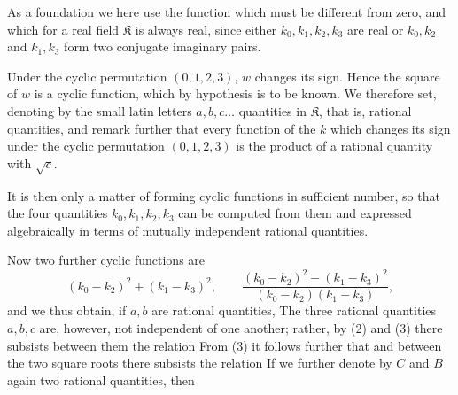 As a foundation we here use the function
which must be different from zero, and which for a real field $\mathfrak{K}$
is always real, since either $k_0, k_1, k_2, k_3$ are real or $k_0, k_2$ and
$k_1, k_3$ form two conjugate imaginary pairs.

Under the cyclic permutation $(0, 1, 2, 3)$, $w$ changes its sign. Hence the
square of $w$ is a cyclic function, which by hypothesis is to be known. We
therefore set, denoting by the small latin letters $a, b, c \ldots$
quantities in $\mathfrak{K}$, that is, rational quantities,
and remark further that every function of the $k$ which changes its sign
under the cyclic permutation $(0, 1, 2, 3)$ is the product of a rational
quantity with $\sqrt{c}$.

It is then only a matter of forming cyclic functions in sufficient number, so
that the four quantities $k_0, k_1, k_2, k_3$ can be computed from them and
expressed algebraically in terms of mutually independent rational quantities.

Now two further cyclic functions are
\[
(k_0 - k_2)^2 + (k_1 - k_3)^2, \qquad \frac{(k_0 - k_2)^2 - (k_1 - k_3)^2}{(k_0 - k_2)(k_1 - k_3)},
\]
and we thus obtain, if $a, b$ are rational quantities,
The three rational quantities $a, b, c$ are, however, not independent of one
another; rather, by (2) and (3) there subsists between them the relation
From (3) it follows further that
and between the two square roots there subsists the relation
If we further denote by $C$ and $B$ again two rational quantities, then
